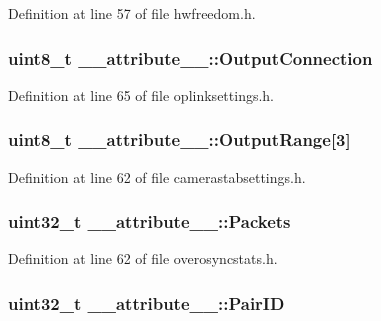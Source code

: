 \-Definition at line 57 of file hwfreedom.\-h.

\hypertarget{struct____attribute_____a091524dfc6db39081b289378d5fc33e8}{
\subsubsection[{\-Output\-Connection}]{\setlength{\rightskip}{0pt plus 5cm}uint8\-\_\-t {\bf \-\_\-\-\_\-attribute\-\_\-\-\_\-\-::\-Output\-Connection}}}\label{struct____attribute_____a091524dfc6db39081b289378d5fc33e8}


\-Definition at line 65 of file oplinksettings.\-h.

\hypertarget{struct____attribute_____a3912a57d03d6b1404cadaca80f12b2b6}{
\subsubsection[{\-Output\-Range}]{\setlength{\rightskip}{0pt plus 5cm}uint8\-\_\-t {\bf \-\_\-\-\_\-attribute\-\_\-\-\_\-\-::\-Output\-Range}\mbox{[}3\mbox{]}}}\label{struct____attribute_____a3912a57d03d6b1404cadaca80f12b2b6}


\-Definition at line 62 of file camerastabsettings.\-h.

\hypertarget{struct____attribute_____ae8acd5254a465454e91f4f9eb57562ad}{
\subsubsection[{\-Packets}]{\setlength{\rightskip}{0pt plus 5cm}uint32\-\_\-t {\bf \-\_\-\-\_\-attribute\-\_\-\-\_\-\-::\-Packets}}}\label{struct____attribute_____ae8acd5254a465454e91f4f9eb57562ad}


\-Definition at line 62 of file overosyncstats.\-h.

\hypertarget{struct____attribute_____afdba08a04bf16a8d9d2a47f2de0138b3}{
\subsubsection[{\-Pair\-I\-D}]{\setlength{\rightskip}{0pt plus 5cm}uint32\-\_\-t {\bf \-\_\-\-\_\-attribute\-\_\-\-\_\-\-::\-Pair\-I\-D}}}\label{struct____attribute_____afdba08a04bf16a8d9d2a47f2de0138b3}


